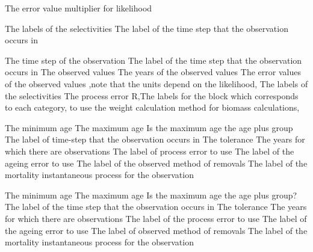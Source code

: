 {The error value multiplier for likelihood}
\par\textbf{}\par
{} {The labels of the selectivities}
 {The label of the time step that the observation occurs in}
\par\textbf{}\par
{} {The time step of the observation}
 {The label of the time step that the observation occurs in}
 {The observed values}
 {The years of the observed values}
 {The error values of the observed values ,note that the units depend on the likelihood,}
 {The labels of the selectivities}
 {The process error}
 {R,The labels for the  block which corresponds to each category, to use the weight calculation method for biomass calculations,}
\par\textbf{}\par
{} {The minimum age}
 {The maximum age}
 {Is the maximum age the age plus group}
 {The label of time-step that the observation occurs in}
 {The tolerance}
 {The years for which there are observations}
 {The label of process error to use}
 {The label of the ageing error to use}
 {The label of the observed method of removals}
 {The label of the mortality instantaneous process for the observation}
\par\textbf{}\par
{} {The minimum age}
 {The maximum age}
 {Is the maximum age the age plus group?}
 {The label of the time step that the observation occurs in}
 {The tolerance}
 {The years for which there are observations}
 {The label of the process error to use}
 {The label of the ageing error to use}
 {The label of observed method of removals}
 {The label of the mortality instantaneous process for the observation}
